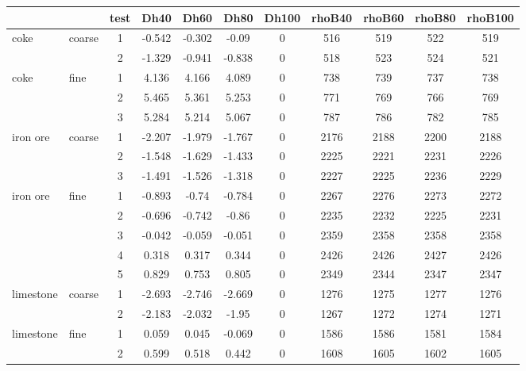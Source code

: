 \begin{table}%
\centering
\begin{tabular}{ll|c|cccc|cccc}
\hline
          &       & test  & Dh40  & Dh60  & Dh80  & Dh100 & rhoB40 & rhoB60 & rhoB80 & rhoB100 \\
\hline          
    coke  & coarse & 1     & -0.542 & -0.302 & -0.09 & 0     & 516   & 519   & 522   & 519 \\
          &       & 2     & -1.329 & -0.941 & -0.838 & 0     & 518   & 523   & 524   & 521 \\
\hline 
    coke  & fine  & 1     & 4.136 & 4.166 & 4.089 & 0     & 738   & 739   & 737   & 738 \\
          &       & 2     & 5.465 & 5.361 & 5.253 & 0     & 771   & 769   & 766   & 769 \\
          &       & 3     & 5.284 & 5.214 & 5.067 & 0     & 787   & 786   & 782   & 785 \\
\hline 
    iron ore & coarse & 1     & -2.207 & -1.979 & -1.767 & 0     & 2176  & 2188  & 2200  & 2188 \\
          &       & 2     & -1.548 & -1.629 & -1.433 & 0     & 2225  & 2221  & 2231  & 2226 \\
          &       & 3     & -1.491 & -1.526 & -1.318 & 0     & 2227  & 2225  & 2236  & 2229 \\
\hline 
    iron ore & fine  & 1     & -0.893 & -0.74 & -0.784 & 0     & 2267  & 2276  & 2273  & 2272 \\
          &       & 2     & -0.696 & -0.742 & -0.86 & 0     & 2235  & 2232  & 2225  & 2231 \\
          &       & 3     & -0.042 & -0.059 & -0.051 & 0     & 2359  & 2358  & 2358  & 2358 \\
          &       & 4     & 0.318 & 0.317 & 0.344 & 0     & 2426  & 2426  & 2427  & 2426 \\
          &       & 5     & 0.829 & 0.753 & 0.805 & 0     & 2349  & 2344  & 2347  & 2347 \\
\hline 
    limestone & coarse & 1     & -2.693 & -2.746 & -2.669 & 0     & 1276  & 1275  & 1277  & 1276 \\
          &       & 2     & -2.183 & -2.032 & -1.95 & 0     & 1267  & 1272  & 1274  & 1271 \\
\hline 
    limestone & fine  & 1     & 0.059 & 0.045 & -0.069 & 0     & 1586  & 1586  & 1581  & 1584 \\
          &       & 2     & 0.599 & 0.518 & 0.442 & 0     & 1608  & 1605  & 1602  & 1605 \\

\end{tabular}
\end{table}
